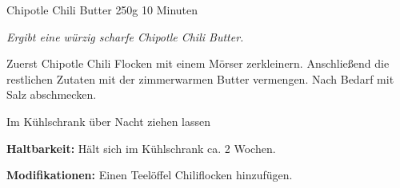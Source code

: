 \begin{recipe}{Chipotle Chili Butter} {250g} {10 Minuten}

\freeform
\textit{Ergibt eine würzig scharfe Chipotle Chili Butter.}


Zuerst Chipotle Chili Flocken mit einem Mörser zerkleinern.
Anschließend die restlichen Zutaten mit der zimmerwarmen Butter vermengen.
Nach Bedarf mit Salz abschmecken.

\newstep
Im Kühlschrank über Nacht ziehen lassen

\freeform
\hrulefill

\freeform 
\textbf{Haltbarkeit:}
Hält sich im Kühlschrank ca. 2 Wochen.

\freeform 
\textbf{Modifikationen:}
Einen Teelöffel Chiliflocken hinzufügen.

\end{recipe}
